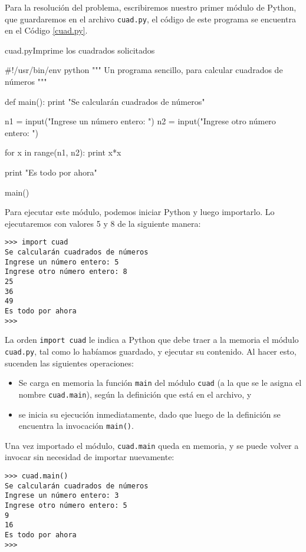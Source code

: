 \begin{solucion}
Para la resolución del problema, escribiremos nuestro primer módulo de
Python, que guardaremos en el archivo \verb!cuad.py!, el código de este
programa se encuentra en el Código \ref{cuad.py}.

\begin{codigo}{cuad.py}{Imprime los cuadrados solicitados}
\label{cuad.py}
\begin{codigo-python}
#!/usr/bin/env python
""" Un programa sencillo, para calcular cuadrados
de números """

def main():
    print "Se calcularán cuadrados de números"

    n1 = input("Ingrese un número entero: ")
    n2 = input("Ingrese otro número entero: ")

    for x in range(n1, n2):
        print x*x

    print "Es todo por ahora"

main()
\end{codigo-python}
\end{codigo}

Para ejecutar este módulo, podemos iniciar Python y luego
importarlo. Lo ejecutaremos con valores 5 y 8 de la siguiente
manera:
\begin{lstlisting}[numbers=none]
>>> import cuad
Se calcularán cuadrados de números
Ingrese un número entero: 5
Ingrese otro número entero: 8
25
36
49
Es todo por ahora
>>>
\end{lstlisting}

La orden \lstinline+import cuad+ le indica a Python que debe traer a la
memoria el módulo \verb+cuad.py+, tal como lo habíamos guardado, y
ejecutar su contenido. Al hacer esto, sucenden las siguientes operaciones:

\begin{itemize}
\item Se carga en memoria la función \lstinline+main+ del módulo
\lstinline+cuad+ (a la que se le asigna el nombre \lstinline+cuad.main+),
según la definición que está en el archivo, y

\item se inicia su ejecución inmediatamente, dado que luego de la
definición se encuentra la invocación \lstinline+main()+.
\end{itemize}

Una vez importado el módulo, \lstinline+cuad.main+ queda en memoria, y
se puede volver a invocar sin necesidad de importar nuevamente:

\begin{lstlisting}[numbers=none]
>>> cuad.main()
Se calcularán cuadrados de números
Ingrese un número entero: 3
Ingrese otro número entero: 5
9
16
Es todo por ahora
>>>
\end{lstlisting}
\end{solucion}

